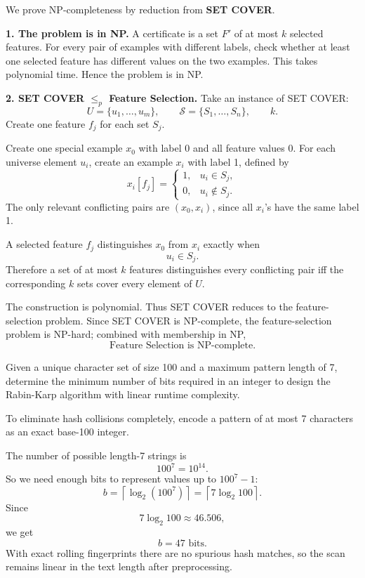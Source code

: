\documentclass[11pt,a4paper]{article}
\begin{document}
\begin{qaanswer}[Answer 5(b)]
We prove NP-completeness by reduction from \textbf{SET COVER}.

\textbf{1. The problem is in NP.}
A certificate is a set \(F'\) of at most \(k\) selected features. For every pair of examples with different labels, check whether at least one selected feature has different values on the two examples. This takes polynomial time. Hence the problem is in NP.

\textbf{2. SET COVER \(\le_p\) Feature Selection.}
Take an instance of SET COVER:
\[
U=\{u_1,\ldots,u_m\},\qquad
\mathcal S=\{S_1,\ldots,S_n\},\qquad k.
\]
Create one feature \(f_j\) for each set \(S_j\).

Create one special example \(x_0\) with label 0 and all feature values 0. For each universe element \(u_i\), create an example \(x_i\) with label 1, defined by
\[
x_i[f_j]=
\begin{cases}
1,&u_i\in S_j,\\
0,&u_i\notin S_j.
\end{cases}
\]
The only relevant conflicting pairs are \((x_0,x_i)\), since all \(x_i\)'s have the same label 1.

A selected feature \(f_j\) distinguishes \(x_0\) from \(x_i\) exactly when
\[
u_i\in S_j.
\]
Therefore a set of at most \(k\) features distinguishes every conflicting pair iff the corresponding \(k\) sets cover every element of \(U\).

The construction is polynomial. Thus SET COVER reduces to the feature-selection problem. Since SET COVER is NP-complete, the feature-selection problem is NP-hard; combined with membership in NP,
\[
\boxed{\text{Feature Selection is NP-complete}.}
\]
\end{qaanswer}

\begin{qaquestion}
Given a unique character set of size 100 and a maximum pattern length of 7, determine the minimum number of bits required in an integer to design the Rabin-Karp algorithm with linear runtime complexity.
\end{qaquestion}

\begin{qaanswer}[Answer 6(a)]
To eliminate hash collisions completely, encode a pattern of at most 7 characters as an exact base-100 integer.

The number of possible length-7 strings is
\[
100^7=10^{14}.
\]
So we need enough bits to represent values up to \(100^7-1\):
\[
b=\left\lceil\log_2(100^7)\right\rceil
=\left\lceil7\log_2 100\right\rceil.
\]
Since
\[
7\log_2 100\approx46.506,
\]
we get
\[
\boxed{b=47\text{ bits}}.
\]
With exact rolling fingerprints there are no spurious hash matches, so the scan remains linear in the text length after preprocessing.
\end{qaanswer}
\end{document}
